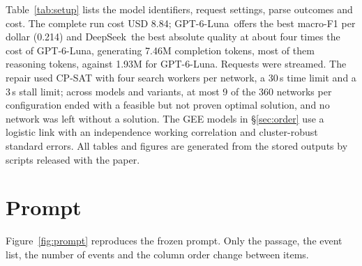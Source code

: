 \documentclass[11pt]{article}
\newcommand{\Ds}{DeepSeek}
\newcommand{\Gp}{GPT-6-Luna}
\begin{document}
Table~\ref{tab:setup} lists the model identifiers, request settings, parse outcomes and cost. The complete run cost USD 8.84; \Gp\ offers the best macro-F1 per dollar (0.214) and \Ds\ the best absolute quality at about four times the cost of \Gp, generating 7.46M completion tokens, most of them reasoning tokens, against 1.93M for \Gp. Requests were streamed. The repair used CP-SAT with four search workers per network, a 30\,s time limit and a 3\,s stall limit; across models and variants, at most 9 of the 360 networks per configuration ended with a feasible but not proven optimal solution, and no network was left without a solution. The GEE models in \S\ref{sec:order} use a logistic link with an independence working correlation and cluster-robust standard errors. All tables and figures are generated from the stored outputs by scripts released with the paper.

\section{Prompt}
\label{app:prompt}

Figure~\ref{fig:prompt} reproduces the frozen prompt. Only the passage, the event list, the number of events and the column order change between items.
\end{document}
